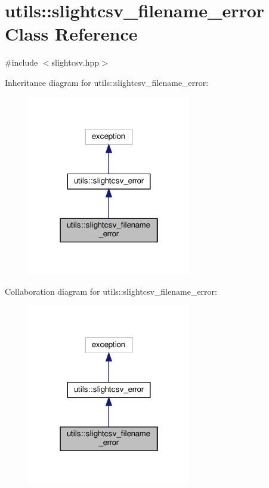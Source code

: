 \hypertarget{classutils_1_1slightcsv__filename__error}{}\section{utils\+:\+:slightcsv\+\_\+filename\+\_\+error Class Reference}
\label{classutils_1_1slightcsv__filename__error}


{\ttfamily \#include $<$slightcsv.\+hpp$>$}



Inheritance diagram for utils\+:\+:slightcsv\+\_\+filename\+\_\+error\+:\nopagebreak
\begin{figure}[H]
\begin{center}
\leavevmode
\includegraphics[width=202pt]{classutils_1_1slightcsv__filename__error__inherit__graph}
\end{center}
\end{figure}


Collaboration diagram for utils\+:\+:slightcsv\+\_\+filename\+\_\+error\+:\nopagebreak
\begin{figure}[H]
\begin{center}
\leavevmode
\includegraphics[width=202pt]{classutils_1_1slightcsv__filename__error__coll__graph}
\end{center}
\end{figure}



